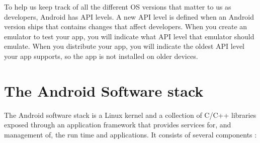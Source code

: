 To help us keep track of all the different OS versions that matter to us as developers, Android has API levels. A new API level is defined when an Android version ships that contains changes that affect developers. When you create an emulator to test your app, you will indicate what API level that emulator should emulate. When you distribute your app, you will indicate the oldest API level your app supports, so the app is not installed on older devices.

\section{The Android Software stack}
The Android software stack is a Linux kernel and a collection of C/C++ libraries exposed through an application framework that provides services for, and management of, the run time and applications. It consists of several components \cite{google2017}:

